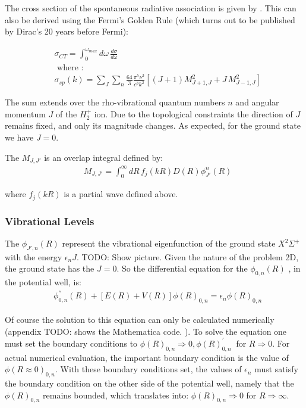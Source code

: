 The cross section of the spontaneous radiative association is given by \cite{Zygelman1} .  This can also be derived 
using the Fermi's Golden Rule (which turns out to be published by Dirac's 20 years before Fermi):

\begin{equation}
\begin{split}
& \sigma_{CT}  = \int_0^{\omega_{max}}{d\omega\,\frac{d\sigma}{d\omega}} \\[.8em]
& \text{ where }: \\[.8em]
& \sigma_{sp}(k) = \sum_J\sum_n{\frac{64}{3}\frac{\pi^5\nu^3}{c^3k^2}\left[(J+1)M_{J+1,J}^2 + J\,M_{J-1,J}^2 \right] }
\end{split}
\end{equation}

The sum extends over the rho-vibrational quantum numbers $ n $ and angular momentum $ J $ of the $ H_2^{+} $ ion. Due to the topological constraints the direction of $ J $ remains fixed, and only its magnitude changes. As expected, for the ground state we have $ J = 0 $. 

The $ M_{J,J'}  $ is an overlap integral defined by:
\begin{equation}
\begin{split}
& M_{J,J'} = \int_0^{\infty}{dR\,f_j(kR)D(R)\phi_{J'}^n(R)}
\end{split}
\end{equation}

where $ f_j(kR) $ is a partial wave defined above. 

\subsubsection{Vibrational Levels}

The $ \phi_{J',n}(R) $ represent the vibrational eigenfunction of the ground state   $ X^2\Sigma^{+} $ with the energy $ \epsilon_nJ $. TODO: Show picture.   Given the nature of the problem 2D, the ground state has the $ J = 0 $. So the differential equation for the  $ \phi_{0,n}(R) $ , in the potential well, is:
\begin{equation}
\begin{split}
& \phi_{0,n}^{''}(R) + \left[ E(R) + V(R)  \right]\phi(R)_{0,n} = \epsilon_n \phi(R)_{0,n}
\end{split}
\end{equation}

Of course the solution to this equation can only be calculated numerically (appendix TODO: shows the Mathematica code. ).  To solve the equation one must set the boundary conditions to  $ \phi(R)_{0,n} \Rightarrow 0, \phi(R)^{'}_{0,n} \ $ for $ R \Rightarrow 0 $. For actual numerical evaluation, the important boundary condition is the value of  $ \phi(R \approx 0 )_{0,n} $.  With these boundary conditions set, the values of $ \epsilon_n $ must satisfy the boundary condition on the other side of the potential well, namely  that the $ \phi(R)_{0,n} $ remains bounded, which translates into: $ \phi(R)_{0,n} \Rightarrow 0 $ for $ R \Rightarrow \infty $. 

